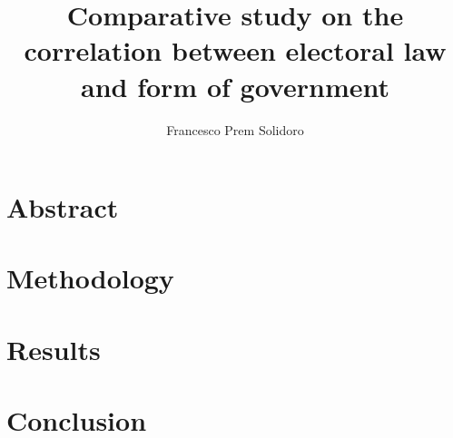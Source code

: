 \documentclass{article}
\title{Comparative study on the correlation between electoral law and form of government}
\author{Francesco Prem Solidoro}
\begin{document}
\maketitle
\section{Abstract}
\section{Methodology}
\section{Results}
\section{Conclusion}
\end{document}
